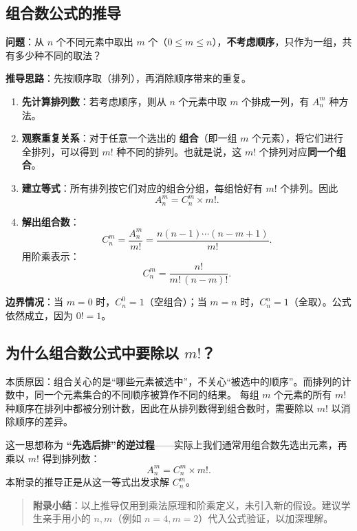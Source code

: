 \documentclass[10pt]{article}
\begin{document}
\subsection{组合数公式的推导}

\textbf{问题}：从 \(n\) 个不同元素中取出 \(m\) 个（\(0 \le m \le n\)），\textbf{不考虑顺序}，只作为一组，共有多少种不同的取法？

\textbf{推导思路}：先按顺序取（排列），再消除顺序带来的重复。

\begin{enumerate}
\item \textbf{先计算排列数}：若考虑顺序，则从 \(n\) 个元素中取 \(m\) 个排成一列，有 \(A_n^m\) 种方法。
\item \textbf{观察重复关系}：对于任意一个选出的 \textbf{组合}（即一组 \(m\) 个元素），将它们进行全排列，可以得到 \(m!\) 种不同的排列。也就是说，这 \(m!\) 个排列对应\textbf{同一个组合}。
\item \textbf{建立等式}：所有排列按它们对应的组合分组，每组恰好有 \(m!\) 个排列。因此
   \[
   A_n^m = C_n^m \times m!.
   \]
\item \textbf{解出组合数}：
   \[
   C_n^m = \frac{A_n^m}{m!} = \frac{n(n-1)\cdots(n-m+1)}{m!}.
   \]
   用阶乘表示：
   \[
   C_n^m = \frac{n!}{m!\,(n-m)!}.
   \]
\end{enumerate}

\textbf{边界情况}：当 \(m=0\) 时，\(C_n^0 = 1\)（空组合）；当 \(m=n\) 时，\(C_n^n = 1\)（全取）。公式依然成立，因为 \(0!=1\)。

\subsection{为什么组合数公式中要除以 \(m!\)？}

本质原因：组合关心的是“哪些元素被选中”，不关心“被选中的顺序”。而排列的计数中，同一个元素集合的不同顺序被算作不同的结果。
每组 \(m\) 个元素的所有 \(m!\) 种顺序在排列中都被分别计数，因此在从排列数得到组合数时，需要除以 \(m!\) 以消除顺序的差异。

这一思想称为 \textbf{“先选后排”的逆过程}——实际上我们通常用组合数先选出元素，再乘以 \(m!\) 得到排列数：
\[
A_n^m = C_n^m \times m!.
\]
本附录的推导正是从这一等式出发求解 \(C_n^m\)。

\begin{quote}
\textbf{附录小结}：以上推导仅用到乘法原理和阶乘定义，未引入新的假设。建议学生亲手用小的 \(n,m\)（例如 \(n=4,m=2\)）代入公式验证，以加深理解。
\end{quote}
\end{document}
